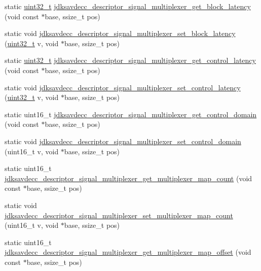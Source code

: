 \begin{DoxyCompactItemize}
\item 
static \hyperlink{parse_8c_a6eb1e68cc391dd753bc8ce896dbb8315}{uint32\+\_\+t} \hyperlink{group__descriptor__signal__multiplexer_ga1d3e6b8e5534f24de8496594688fe571}{jdksavdecc\+\_\+descriptor\+\_\+signal\+\_\+multiplexer\+\_\+get\+\_\+block\+\_\+latency} (void const $\ast$base, ssize\+\_\+t pos)
\item 
static void \hyperlink{group__descriptor__signal__multiplexer_ga840e7509b974fbe51902ed655a5631e8}{jdksavdecc\+\_\+descriptor\+\_\+signal\+\_\+multiplexer\+\_\+set\+\_\+block\+\_\+latency} (\hyperlink{parse_8c_a6eb1e68cc391dd753bc8ce896dbb8315}{uint32\+\_\+t} v, void $\ast$base, ssize\+\_\+t pos)
\item 
static \hyperlink{parse_8c_a6eb1e68cc391dd753bc8ce896dbb8315}{uint32\+\_\+t} \hyperlink{group__descriptor__signal__multiplexer_ga7a005849d3a05d873e60b97e9509aad4}{jdksavdecc\+\_\+descriptor\+\_\+signal\+\_\+multiplexer\+\_\+get\+\_\+control\+\_\+latency} (void const $\ast$base, ssize\+\_\+t pos)
\item 
static void \hyperlink{group__descriptor__signal__multiplexer_gad1559d27aec0c840036aa4b5a8be41f1}{jdksavdecc\+\_\+descriptor\+\_\+signal\+\_\+multiplexer\+\_\+set\+\_\+control\+\_\+latency} (\hyperlink{parse_8c_a6eb1e68cc391dd753bc8ce896dbb8315}{uint32\+\_\+t} v, void $\ast$base, ssize\+\_\+t pos)
\item 
static uint16\+\_\+t \hyperlink{group__descriptor__signal__multiplexer_ga2faf0061023fc392ae4119564d489937}{jdksavdecc\+\_\+descriptor\+\_\+signal\+\_\+multiplexer\+\_\+get\+\_\+control\+\_\+domain} (void const $\ast$base, ssize\+\_\+t pos)
\item 
static void \hyperlink{group__descriptor__signal__multiplexer_ga9067e5cdce9b08ffcec691f1203840ee}{jdksavdecc\+\_\+descriptor\+\_\+signal\+\_\+multiplexer\+\_\+set\+\_\+control\+\_\+domain} (uint16\+\_\+t v, void $\ast$base, ssize\+\_\+t pos)
\item 
static uint16\+\_\+t \hyperlink{group__descriptor__signal__multiplexer_ga0d364a358d972265a34951f0e8984c58}{jdksavdecc\+\_\+descriptor\+\_\+signal\+\_\+multiplexer\+\_\+get\+\_\+multiplexer\+\_\+map\+\_\+count} (void const $\ast$base, ssize\+\_\+t pos)
\item 
static void \hyperlink{group__descriptor__signal__multiplexer_ga2b0d324ba223cc94ca23d98ea5f00a51}{jdksavdecc\+\_\+descriptor\+\_\+signal\+\_\+multiplexer\+\_\+set\+\_\+multiplexer\+\_\+map\+\_\+count} (uint16\+\_\+t v, void $\ast$base, ssize\+\_\+t pos)
\item 
static uint16\+\_\+t \hyperlink{group__descriptor__signal__multiplexer_ga4cf4bc8346925c5726cec4b48a0a6b2b}{jdksavdecc\+\_\+descriptor\+\_\+signal\+\_\+multiplexer\+\_\+get\+\_\+multiplexer\+\_\+map\+\_\+offset} (void const $\ast$base, ssize\+\_\+t pos)

\end{DoxyCompactItemize}
